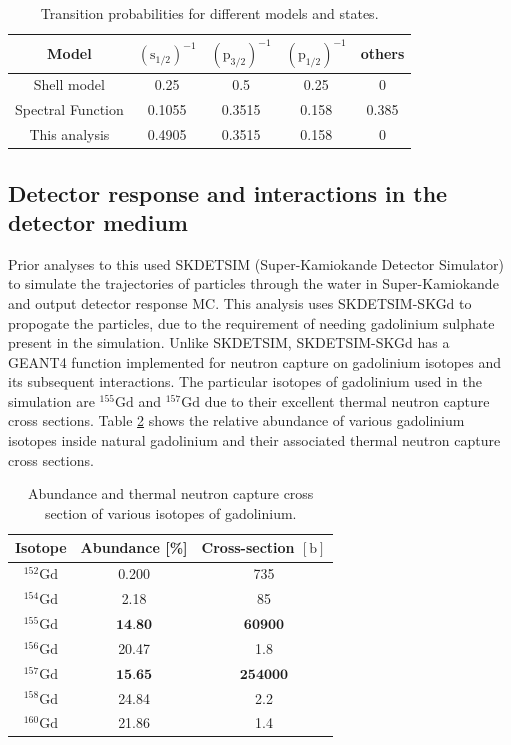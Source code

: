 \begin{table}
    \centering
    \begin{tabular}{||ccccc||}
        \hline Model & $\left(\mathrm{s}_{1 / 2}\right)^{-1}$ & $\left(\mathrm{p}_{3 / 2}\right)^{-1}$ & $\left(\mathrm{p}_{1 / 2}\right)^{-1}$ & others \\
        \hline Shell model & 0.25 & 0.5 & 0.25 & 0 \\
        Spectral Function & 0.1055 & 0.3515 & 0.158 & 0.385 \\
        This analysis & 0.4905 & 0.3515 & 0.158 & 0 \\
        \hline
        \end{tabular}
\caption{Transition probabilities for different models and states.}
\label{table:transitionprob}
\end{table}

\subsection{Detector response and interactions in the detector medium}

Prior analyses to this used SKDETSIM (Super-Kamiokande Detector Simulator) to simulate the trajectories of particles through the water in Super-Kamiokande and output detector response MC. This analysis uses SKDETSIM-SKGd to propogate the particles, due to the requirement of needing gadolinium sulphate present in the simulation. Unlike SKDETSIM, SKDETSIM-SKGd has a GEANT4 function implemented for neutron capture on gadolinium isotopes and its subsequent interactions. The particular isotopes of gadolinium used in the simulation are ${ }^{155} \mathrm{Gd}$ and ${ }^{157} \mathrm{Gd}$ due to their excellent thermal neutron capture cross sections. Table \ref{table:gdtable} shows the relative abundance of various gadolinium isotopes inside natural gadolinium and their associated thermal neutron capture cross sections.

\begin{table}
    \centering
    \begin{tabular}{||ccc||}
        \hline Isotope & Abundance [\%] & Cross-section $[\mathrm{b}]$ \\
        \hline${ }^{152} \mathrm{Gd}$ & 0.200 & 735 \\
        ${ }^{154} \mathrm{Gd}$ & 2.18 & 85 \\
        ${ }^{155} \mathrm{Gd}$ & $\mathbf{1 4 . 8 0}$ & $\mathbf{6 0 9 0 0}$ \\
        ${ }^{156} \mathrm{Gd}$ & 20.47 & 1.8 \\
        ${ }^{157} \mathrm{Gd}$ & $\mathbf{1 5 . 6 5}$ & $\mathbf{2 5 4 0 0 0}$ \\
        ${ }^{158} \mathrm{Gd}$ & 24.84 & 2.2 \\
        ${ }^{160} \mathrm{Gd}$ & 21.86 & 1.4 \\
        \hline
        \end{tabular}
\caption{Abundance and thermal neutron capture cross section of various isotopes of gadolinium.}
\label{table:gdtable}
\end{table}

